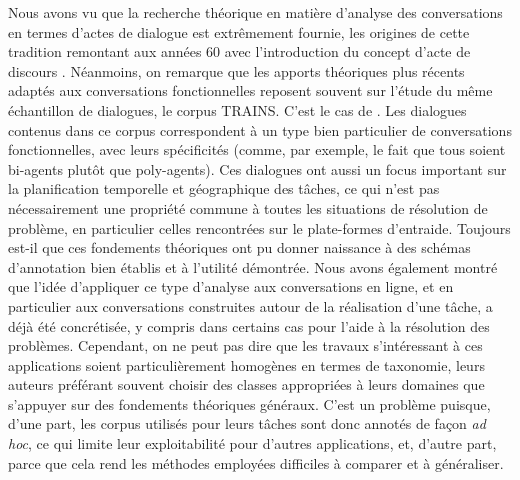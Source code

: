 \documentclass[10pt,a4paper,twoside]{article}
\begin{document}
Nous avons vu que la recherche théorique en matière d'analyse des conversations en termes d'actes de dialogue est extrêmement fournie, les origines de cette tradition remontant aux années 60 avec l'introduction du concept d'acte de discours \cite{austin1975how, searle1969speech}. Néanmoins, on remarque que les apports théoriques plus récents adaptés aux conversations fonctionnelles reposent souvent sur l'étude du même échantillon de dialogues, le corpus TRAINS. C'est le cas de \citet{traum1992conversation, poesio1997conversational, core1997coding, bunt2009dit++}. Les dialogues contenus dans ce corpus correspondent à un type bien particulier de conversations fonctionnelles, avec leurs spécificités (comme, par exemple, le fait que tous soient bi-agents plutôt que poly-agents). Ces dialogues ont aussi un focus important sur la planification temporelle et géographique des tâches, ce qui n'est pas nécessairement une propriété commune à toutes les situations de résolution de problème, en particulier celles rencontrées sur le plate-formes d'entraide. Toujours est-il que ces fondements théoriques ont pu donner naissance à des schémas d'annotation bien établis et à l'utilité démontrée. Nous avons également montré que l'idée d'appliquer ce type d'analyse aux conversations en ligne, et en particulier aux conversations construites autour de la réalisation d'une tâche, a déjà été concrétisée, y compris dans certains cas pour l'aide à la résolution des problèmes. Cependant, on ne peut pas dire que les travaux s'intéressant à ces applications soient particulièrement homogènes en termes de taxonomie, leurs auteurs préférant souvent choisir des classes appropriées à leurs domaines que s'appuyer sur des fondements théoriques généraux. C'est un problème puisque, d'une part, les corpus utilisés pour leurs tâches sont donc annotés de façon \textit{ad hoc}, ce qui limite leur exploitabilité pour d'autres applications, et, d'autre part, parce que cela rend les méthodes employées difficiles à comparer et à généraliser.
\end{document}
